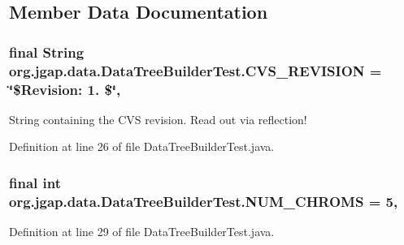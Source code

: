 \subsection{Member Data Documentation}
\hypertarget{classorg_1_1jgap_1_1data_1_1_data_tree_builder_test_aa0655723fe40a4190a32c3d1e79e773c}{
\subsubsection[{C\-V\-S\-\_\-\-R\-E\-V\-I\-S\-I\-O\-N}]{\setlength{\rightskip}{0pt plus 5cm}final String org.\-jgap.\-data.\-Data\-Tree\-Builder\-Test.\-C\-V\-S\-\_\-\-R\-E\-V\-I\-S\-I\-O\-N = \char`\"{}\$Revision\-: 1. \$\char`\"{}\hspace{0.3cm}{\ttfamily [static]}, {\ttfamily [private]}}}\label{classorg_1_1jgap_1_1data_1_1_data_tree_builder_test_aa0655723fe40a4190a32c3d1e79e773c}
String containing the C\-V\-S revision. Read out via reflection! 

Definition at line 26 of file Data\-Tree\-Builder\-Test.\-java.

\hypertarget{classorg_1_1jgap_1_1data_1_1_data_tree_builder_test_a044a27fdc84ec1b3063b48f8894a79f4}{
\subsubsection[{N\-U\-M\-\_\-\-C\-H\-R\-O\-M\-S}]{\setlength{\rightskip}{0pt plus 5cm}final int org.\-jgap.\-data.\-Data\-Tree\-Builder\-Test.\-N\-U\-M\-\_\-\-C\-H\-R\-O\-M\-S = 5\hspace{0.3cm}{\ttfamily [static]}, {\ttfamily [private]}}}\label{classorg_1_1jgap_1_1data_1_1_data_tree_builder_test_a044a27fdc84ec1b3063b48f8894a79f4}


Definition at line 29 of file Data\-Tree\-Builder\-Test.\-java.



